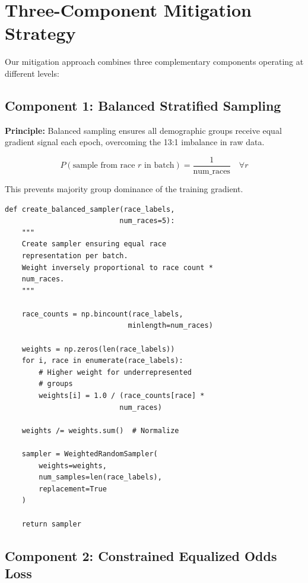 \documentclass[11pt,a4paper,oneside]{report}
\begin{document}
\section{Three-Component Mitigation Strategy}

Our mitigation approach combines three complementary components operating at different levels:

\subsection{Component 1: Balanced Stratified Sampling}

\textbf{Principle:} Balanced sampling ensures all demographic groups receive equal gradient signal each epoch, overcoming the 13:1 imbalance in raw data.

\begin{equation}
P(\text{sample from race } r \text{ in batch}) = \frac{1}{\text{num\_races}} \quad \forall r
\end{equation}

This prevents majority group dominance of the training gradient.

\begin{lstlisting}[caption=Balanced Demographic Sampler]
def create_balanced_sampler(race_labels, 
                           num_races=5):
    """
    Create sampler ensuring equal race 
    representation per batch.
    Weight inversely proportional to race count * 
    num_races.
    """
    
    race_counts = np.bincount(race_labels, 
                             minlength=num_races)
    
    weights = np.zeros(len(race_labels))
    for i, race in enumerate(race_labels):
        # Higher weight for underrepresented 
        # groups
        weights[i] = 1.0 / (race_counts[race] * 
                           num_races)
    
    weights /= weights.sum()  # Normalize
    
    sampler = WeightedRandomSampler(
        weights=weights,
        num_samples=len(race_labels),
        replacement=True
    )
    
    return sampler
\end{lstlisting}

\subsection{Component 2: Constrained Equalized Odds Loss}
\end{document}
